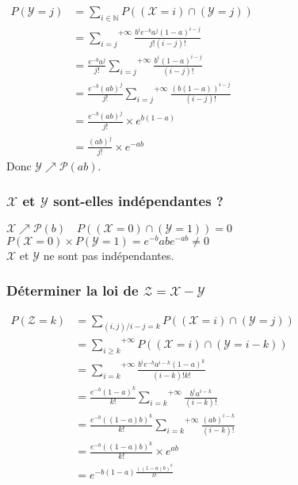 \documentclass[a4paper, 12pt]{article}
\begin{document}
$
\begin{aligned}
P(\mathcal{Y} = j) &= \underset{i \in \mathbb{N}}{\sum} P((\mathcal{X} = i) \cap (\mathcal{Y} = j)) \\
&= \overset{+\infty}{\underset{i = j}{\sum}} \frac{b^i e^{-b} a^j (1 - a)^{i - j}}{j! (i - j)!} \\
&= \frac{e^{-b} a^j}{j!} \overset{+\infty}{\underset{i = j}{\sum}} \frac{b^i (1 - a)^{i - j}}{(i - j)!} \\
&= \frac{e^{-b} (ab)^j}{j!} \overset{+\infty}{\underset{i = j}{\sum}} \frac{(b(1 - a))^{i - j}}{(i - j)!} \\
&= \frac{e ^{-b} (ab)^j}{j!} \times e^{b (1 - a)} \\
&\boxed{= \frac{(ab)^j}{j!} \times e^{-ab} }
\end{aligned}
$\\

Donc $\mathcal{Y} \nearrow \mathcal{P} (ab)$. 


\subsubsection{$\mathcal{X}$ et $\mathcal{Y}$ sont-elles indépendantes ?}
\begin{flushleft}
$\mathcal{X} \nearrow \mathcal{P} (b) \quad P((\mathcal{X} = 0) \cap (\mathcal{Y} = 1)) = 0$ \\
$P(\mathcal{X} = 0) \times P(\mathcal{Y} = 1) = e^{-b} ab e^{-ab} \neq 0$ \\
$\mathcal{X}$ et $\mathcal{Y}$ ne sont pas indépendantes.
\end{flushleft}


\subsubsection{Déterminer la loi de $\mathcal{Z} = \mathcal{X} - \mathcal{Y}$}
$
\begin{aligned}
P(\mathcal{Z} = k) &= \underset{(i, j) / i - j = k}{\sum} P((\mathcal{X} = i) \cap (\mathcal{Y} = j)) \\
&= \overset{+\infty}{\underset{i \geq k}{\sum}} P((\mathcal{X} = i) \cap (\mathcal{Y} = i - k)) \\
&= \overset{+\infty}{\underset{i = k}{\sum}} \frac{b^i e^{-b} a^{i - k} (1 - a)^k}{(i - k)! k!} \\
&= \frac{e^{-b} (1 - a)^k}{k!} \overset{+\infty}{\underset{i = k}{\sum}} \frac{b^i a^{i - k}}{(i - k)!} \\
&= \frac{e^{-b} ((1 - a)b)^k}{k!} \overset{+\infty}{\underset{i = k}{\sum}} \frac{(ab)^{i - k}}{(i - k)!} \\
&= \frac{e^{-b} ((1 - a)b)^k}{k!} \times e^{ab} \\
&= e^{-b (1 - a) \frac{((1 - a)b)^k}{k!}}
\end{aligned}
$ \\
\end{document}
